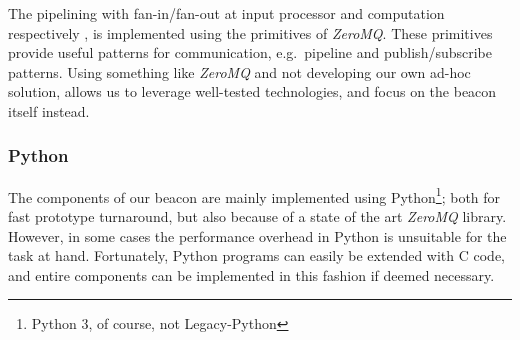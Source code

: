 The pipelining with fan-in/fan-out at input processor and computation respectively , is implemented using the primitives of \textit{ZeroMQ}.
These primitives provide useful patterns for communication, e.g.\ pipeline and publish/subscribe patterns.
Using something like \textit{ZeroMQ} and not developing our own ad-hoc solution, allows us to leverage well-tested technologies, and focus on the beacon itself instead.

\subsubsection{Python}
The components of our beacon are mainly implemented using Python\footnote{Python 3, of course, not Legacy-Python}; both for fast prototype turnaround, but also because of a state of the art \textit{ZeroMQ} library.
However, in some cases the performance overhead in Python is unsuitable for the task at hand.
Fortunately, Python programs can easily be extended with C code, and entire components can be implemented in this fashion if deemed necessary.
